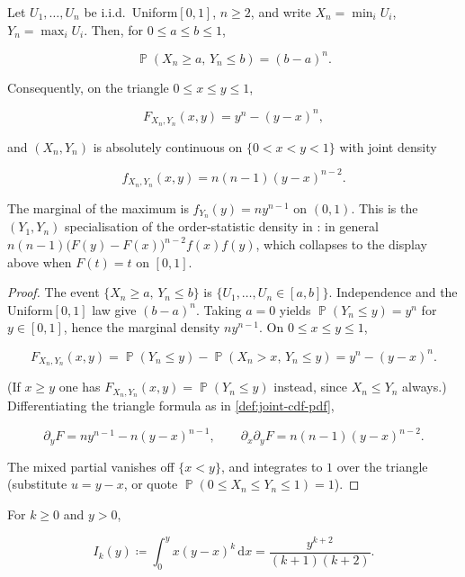 \documentclass[11pt,a4paper]{article}
\DeclareMathOperator{\Pbb}{\mathbb{P}}
\begin{document}
\begin{proposition}
\label{prop:unif-minmax}
Let \( U_{1},\dots,U_{n} \) be i.i.d.\ Uniform\( [0,1] \), \( n\ge 2 \), and write \( X_{n}=\min_{i}U_{i} \), \( Y_{n}=\max_{i}U_{i} \). Then, for \( 0\le a\le b\le 1 \),

\[
\Pbb(X_{n}\ge a,\,Y_{n}\le b)
=
(b-a)^{n}.
\]

Consequently, on the triangle \( 0\le x\le y\le 1 \),

\[
F_{X_{n},Y_{n}}(x,y)
=
y^{n}-(y-x)^{n},
\]

and \( (X_{n},Y_{n}) \) is absolutely continuous on \( \{0<x<y<1\} \) with joint density

\[
f_{X_{n},Y_{n}}(x,y)
=
n(n-1)(y-x)^{n-2}.
\]

The marginal of the maximum is \( f_{Y_{n}}(y)=n y^{n-1} \) on \( (0,1) \). This is the \( (Y_{1},Y_{n}) \) specialisation of the order-statistic density in \citep[\S4.4]{hogg2019}: in general \( n(n-1)\bigl(F(y)-F(x)\bigr)^{n-2}f(x)f(y) \), which collapses to the display above when \( F(t)=t \) on \( [0,1] \).
\end{proposition}

\begin{proof}
The event \( \{X_{n}\ge a,\,Y_{n}\le b\} \) is \( \{U_{1},\dots,U_{n}\in[a,b]\} \). Independence and the Uniform\( [0,1] \) law give \( (b-a)^{n} \). Taking \( a=0 \) yields \( \Pbb(Y_{n}\le y)=y^{n} \) for \( y\in[0,1] \), hence the marginal density \( n y^{n-1} \). On \( 0\le x\le y\le 1 \),

\[
F_{X_{n},Y_{n}}(x,y)
=
\Pbb(Y_{n}\le y)-\Pbb(X_{n}>x,\,Y_{n}\le y)
=
y^{n}-(y-x)^{n}.
\]

(If \( x\ge y \) one has \( F_{X_{n},Y_{n}}(x,y)=\Pbb(Y_{n}\le y) \) instead, since \( X_{n}\le Y_{n} \) always.) Differentiating the triangle formula as in \cref{def:joint-cdf-pdf},

\[
\partial_{y}F
=
n y^{n-1}-n(y-x)^{n-1},
\qquad
\partial_{x}\partial_{y}F
=
n(n-1)(y-x)^{n-2}.
\]

The mixed partial vanishes off \( \{x<y\} \), and integrates to \( 1 \) over the triangle (substitute \( u=y-x \), or quote \( \Pbb(0\le X_{n}\le Y_{n}\le 1)=1 \)).
\end{proof}

\begin{lemma}
\label{lem:Ik}
For \( k\ge 0 \) and \( y>0 \),

\[
I_{k}(y)
\coloneqq
\int_{0}^{y} x(y-x)^{k}\,\mathrm{d}x
=
\frac{y^{k+2}}{(k+1)(k+2)}.
\]
\end{lemma}
\end{document}
